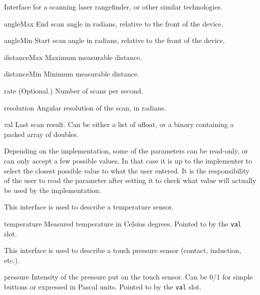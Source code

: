 Interface for a scanning laser rangefinder, or other similar technologies.

\begin{urbiscriptapi}
\item[angleMax] End scan angle in radians, relative to the front of the
  device.


\item[angleMin] Start scan angle in radians, relative to the front of the
  device.


\item[distanceMax] Maximum measurable distance.


\item[distanceMin] Minimum measurable distance.


\item[rate]{} (Optional.) Number of scans per second.


\item[resolution] Angular resolution of the scan, in radians.


\item[val] Last scan result. Can be either a list of ufloat, or a binary
  containing a packed array of doubles.
\end{urbiscriptapi}

Depending on the implementation, some of the parameters can be read-only, or
can only accept a few possible values. In that case it is up to the implementer
to select the closest possible value to what the user entered. It is the
responsibility of the user to read the parameter after setting it to check
what value will actually be used by the implementation.


This interface is used to describe a temperature sensor.

\begin{urbiscriptapi}
\item[temperature] Measured temperature in Celsius degrees.  Pointed to by
  the \lstinline{val} slot.
\end{urbiscriptapi}


This interface is used to describe a touch pressure sensor (contact,
induction, etc.).

\begin{urbiscriptapi}
\item[pressure] Intensity of the pressure put on the touch sensor. Can be
  0/1 for simple buttons or expressed in Pascal units. Pointed to by the
  \lstinline{val} slot.
\end{urbiscriptapi}


